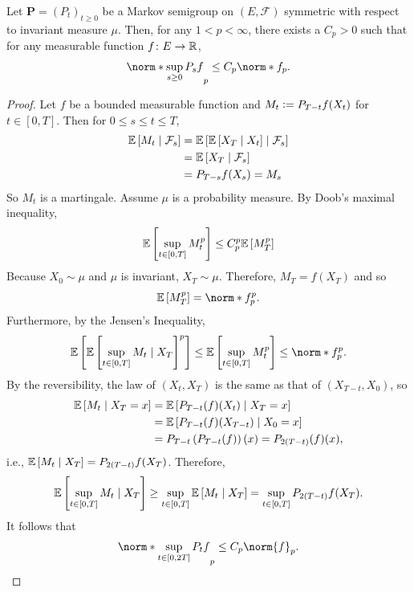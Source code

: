 \begin{enumerate}[label=\arabic{*}.]
	\begin{lem}
	    Let $\mathbf{P} = (P_t)_{t \geq 0}$ be a Markov semigroup on $(E,\mathcal{F})$ symmetric with respect to invariant measure $\mu$. Then, for any $1 < p < \infty$, there exists a $C_p > 0$ such that for any measurable function $f \colon E \rightarrow \mathbb{R}$,
	    \begin{equation*}
	        \norm*{\sup_{s \geq 0}P_sf}_p \leq C_p\norm*{f}_p.
	    \end{equation*}
	\end{lem}
	\begin{proof}
		Let $f$ be a bounded measurable function and $M_t \vcentcolon= P_{T-t}f(X_t)$ for $t \in [0,T]$. Then for $0 \leq s \leq t \leq T$,
		\begin{equation*}
		    \begin{aligned}
		    	\mathbb{E}\left[M_t \mid \mathcal{F}_s\right] &= \mathbb{E}\left[ \mathbb{E}\left[ X_T \mid X_t\right] \mid \mathcal{F}_s\right] \\
		    	&= \mathbb{E}\left[X_T \mid \mathcal{F}_s\right] \\
		    	&= P_{T-s}f(X_s) = M_s
		    \end{aligned}
		\end{equation*}
		So $M_t$ is a martingale. Assume $\mu$ is a probability measure. By Doob's maximal inequality,
		\begin{equation*}
		    \mathbb{E}\left[\sup_{t \in [0,T]} M_t^p\right] \leq C_p^p \mathbb{E}\left[M_T^p\right]
		\end{equation*}
		Because $X_0 \sim \mu$ and $\mu$ is invariant, $X_T \sim \mu$. Therefore, $M_T = f(X_T)$ and so
		\begin{equation*}
		    \E\bj{M_T^p} = \norm*{f}_p^p.
		\end{equation*}
		Furthermore, by the Jensen's Inequality,
		\begin{equation*}
		    \E\bj{\E\bj{\sup_{t \in [0,T]} M_t \mid X_T}^p} \leq \E\bj{\sup_{t \in [0,T]} M_t^p} \leq \norm*{f}_p^p.
		\end{equation*}
		By the reversibility, the law of $(X_t,X_T)$ is the same as that of $(X_{T-t},X_0)$, so
		\begin{equation*}
		    \begin{aligned}
		    	\mathbb{E}\left[M_t \mid X_T = x\right] &= \mathbb{E} \left[ P_{T-t}(f)(X_t) \mid X_T = x\right] \\
		    	&= \mathbb{E} \left[P_{T-t}(f)(X_{T-t}) \mid X_0 = x\right] \\
		    	&= P_{T-t}\left(P_{T-t}(f)\right)(x) = P_{2(T-t)}(f)(x),
		    \end{aligned}
		\end{equation*}
		i.e., $\mathbb{E}\left[M_t \mid X_T\right] = P_{2(T-t)}f(X_T)$. Therefore,
		\begin{equation*}
		    \mathbb{E}\left[\sup_{t \in [0,T]} M_t \mid X_T\right] \geq \sup_{t \in [0,T]}\mathbb{E}\left[ M_t \mid X_T\right] = \sup_{t \in [0,T]} P_{2(T-t)}f(X_T).
		\end{equation*}
		It follows that
		\begin{equation*}
		    \norm*{\sup_{t \in [0,2T]} P_{t}f}_p \leq C_p\norm{f}_p. \qedhere
		\end{equation*}
	\end{proof}


\end{enumerate}
